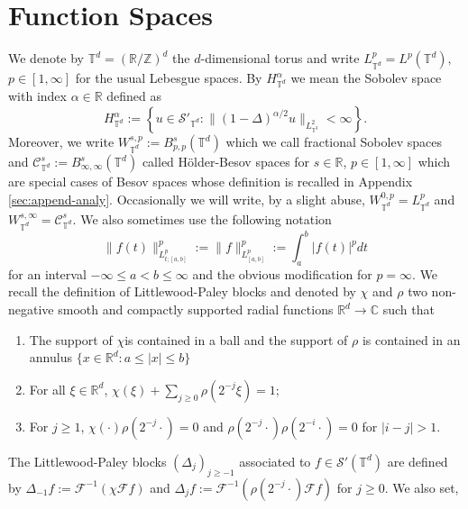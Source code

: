 \section*{Function Spaces}
We denote by $\mathbb{T}^d = (\mathbb{R}/\mathbb{Z})^d$ the $d$-dimensional
torus and write $L_{\mathbb{T}^d}^p = L^p (\mathbb{T}^d),$ $p \in [1, \infty]$
for the usual Lebesgue spaces. By $H_{\mathbb{T}^d}^{\alpha}$ we mean the
Sobolev space with index $\alpha \in \mathbb{R}$ defined as
\[
H_{\mathbb{T}^d}^{\alpha} := \left\{ u \in \mathcal{S}'_{\mathbb{T}^d} :
\| (1 - \Delta)^{\alpha / 2} u \|_{L_{\mathbb{T}^3}^2} < \infty \right\}.
\]
Moreover, we write $W_{\mathbb{T}^d}^{s, p} := B_{p, p}^s (\mathbb{T}^d)$
which we call fractional Sobolev spaces and
$\mathcal{C}_{\mathbb{T}^d}^s := B_{\infty, \infty}^s (\mathbb{T}^d)$
called H{\"o}lder-Besov spaces for $s \in \mathbb{R}$, $p \in [1,
\infty]$ which are special cases of Besov spaces whose definition is recalled
in Appendix \ref{sec:append-analy}. Occasionally we will write, by a slight
abuse, $W_{\mathbb{T}^d}^{0, p} = L_{\mathbb{T}^d}^p$ and
$W_{\mathbb{T}^d}^{s, \infty} =\mathcal{C}_{\mathbb{T}^d}^s .$ We also sometimes use the following notation 
\[
\| f (t) \|^p_{L_{t ; [a, b]}^p}
:= \| f \|^p_{L_{[a, b]}^p} := \int^b_a | f (t) |^p d t
\]
for an interval $- \infty \leqslant a < b \leqslant
\infty$ and the obvious modification for $p = \infty$. We recall the definition of Littlewood-Paley blocks and denoted by
$\chi$ and $\rho$ two non-negative smooth and compactly supported radial
functions $\mathbb{R}^d \rightarrow \mathbb{C}$ such that
\begin{enumerate}
  \item The support of $\chi$is contained in a ball and the support of $\rho$
  is contained in an annulus $\{ x \in \mathbb{R}^d : a \leqslant | x |
  \leqslant b \}$
  
  \item For all $\xi \in \mathbb{R}^d$, $\chi (\xi) + \underset{j \geqslant
  0}{\sum} \rho (2^{- j} \xi) = 1$;
  
  \item For $j \geqslant 1$, $\chi (\cdot) \rho (2^{- j} \cdot) = 0$ and
  $\rho (2^{- j} \cdot) \rho (2^{- i} \cdot) = 0$ for $| i - j | > 1$.
\end{enumerate}
The Littlewood-Paley blocks $(\Delta_j)_{j \geqslant - 1}$ associated to $f
\in \mathcal{S}' (\mathbb{T}^d)$ are defined by $\Delta_{- 1} f :=
\mathcal{F}^{- 1} (\chi \mathcal{F} f)$ and $\Delta_j f := \mathcal{F}^{-
1} (\rho (2^{- j} \cdot) \mathcal{F} f)$ for $j \geqslant 0$. We also set,
